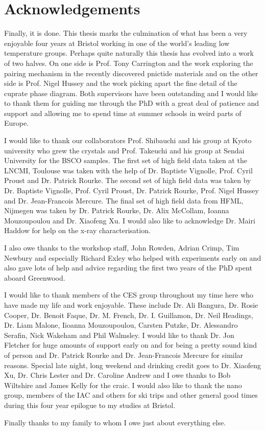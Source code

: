 \cleardoublepage

\section*{Acknowledgements}

Finally, it is done. This thesis marks the culmination of what has been a very enjoyable four years at Bristol working in one of the world's leading low temperature groups. Perhaps quite naturally this thesis has evolved into a work of two halves. On one side is Prof. Tony Carrington and the work exploring the pairing mechanism in the recently discovered pnictide materials and on the other side is Prof. Nigel Hussey and the work picking apart the fine detail of the cuprate phase diagram. Both supervisors have been outstanding and I would like to thank them for guiding me through the PhD with a great deal of patience and support and allowing me to spend time at summer schools in weird parts of Europe.

I would like to thank our collaborators Prof. Shibauchi and his group at Kyoto university who grew the \BaFeAsP{} crystals and Prof. Takeuchi and his group at Sendai University for the \acs{BSCO} samples. The first set of high field data taken at the \ac{LNCMI}, Toulouse was taken with the help of Dr. Baptiste Vignolle, Prof. Cyril Proust and Dr. Patrick Rourke. The second set of high field data was taken by Dr. Baptiste Vignolle, Prof. Cyril Proust, Dr. Patrick Rourke, Prof. Nigel Hussey and Dr. Jean-Francois Mercure. The final set of high field data from \ac{HFML}, Nijmegen was taken by Dr. Patrick Rourke, Dr. Alix McCollam, Ioanna Mouzoupoulou and Dr. Xiaofeng Xu. I would also like to acknowledge Dr. Mairi Haddow for help on the x-ray characterisation.

I also owe thanks to the workshop staff, John Rowden, Adrian Crimp, Tim Newbury and especially Richard Exley who helped with experiments early on and also gave lots of help and advice regarding the first two years of the PhD spent aboard Greenwood.

I would like to thank members of the CES group throughout my time here who have made my life and work enjoyable. These include Dr. Ali Bangura, Dr. Rosie Cooper, Dr. Benoit Faque, Dr. M. French, Dr. I. Guillamon, Dr. Neil Headings, Dr. Liam Malone, Iioanna Mouzoupoulou, Carsten Putzke, Dr. Alessandro Serafin, Nick Wakeham and Phil Walmsley. I would like to thank Dr. Jon Fletcher for huge amounts of support early on and for being a pretty sound kind of person and Dr. Patrick Rourke and Dr. Jean-Francois Mercure for similar reasons. Special late night, long weekend and drinking credit goes to Dr. Xiaofeng Xu, Dr. Chris Lester and Dr. Caroline Andrew and I owe thanks to Bob Wiltshire and James Kelly for the craic. I would also like to thank the nano group, members of the IAC and others for ski trips and other general good times during this four year epilogue to my studies at Bristol.

Finally thanks to my family to whom I owe just about everything else.




